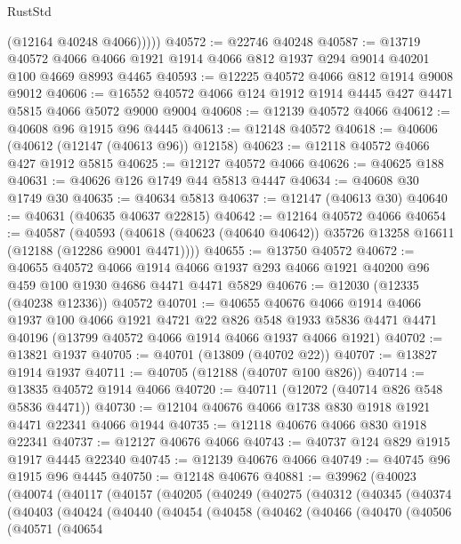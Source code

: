 \begin{lexlean}{RustStd}
\begin{coremodule}
            (@12164 @40248 @4066)))))
@40572 := @22746 @40248
@40587 := @13719
    @40572
    @4066
    @4066
    @1921
    @1914
    @4066
    @812
    @1937
    @294
    @9014
    @40201
    @100
    @4669
    @8993
    @4465
@40593 := @12225 @40572 @4066 @812 @1914 @9008 @9012
@40606 := @16552 @40572 @4066 @124 @1912 @1914 @4445 @427 @4471 @5815 @4066 @5072 @9000 @9004
@40608 := @12139 @40572 @4066
@40612 := @40608 @96 @1915 @96 @4445
@40613 := @12148 @40572
@40618 := @40606 (@40612 (@12147 (@40613 @96)) @12158)
@40623 := @12118 @40572 @4066 @427 @1912 @5815
@40625 := @12127 @40572 @4066
@40626 := @40625 @188
@40631 := @40626 @126 @1749 @44 @5813 @4447
@40634 := @40608 @30 @1749 @30
@40635 := @40634 @5813
@40637 := @12147 (@40613 @30)
@40640 := @40631 (@40635 @40637 @22815)
@40642 := @12164 @40572 @4066
@40654 := @40587
    (@40593 (@40618 (@40623 (@40640 @40642)) @35726 @13258 @16611 (@12188 (@12286 @9001 @4471))))
@40655 := @13750 @40572
@40672 := @40655
    @40572
    @4066
    @1914
    @4066
    @1937
    @293
    @4066
    @1921
    @40200
    @96
    @459
    @100
    @1930
    @4686
    @4471
    @4471
    @5829
@40676 := @12030 (@12335 (@40238 @12336)) @40572
@40701 := @40655
    @40676
    @4066
    @1914
    @4066
    @1937
    @100
    @4066
    @1921
    @4721
    @22
    @826
    @548
    @1933
    @5836
    @4471
    @4471
    @40196
    (@13799 @40572 @4066 @1914 @4066 @1937 @4066 @1921)
@40702 := @13821 @1937
@40705 := @40701 (@13809 (@40702 @22))
@40707 := @13827 @1914 @1937
@40711 := @40705 (@12188 (@40707 @100 @826))
@40714 := @13835 @40572 @1914 @4066
@40720 := @40711 (@12072 (@40714 @826 @548 @5836 @4471))
@40730 := @12104 @40676 @4066 @1738 @830 @1918 @1921 @4471 @22341 @4066 @1944
@40735 := @12118 @40676 @4066 @830 @1918 @22341
@40737 := @12127 @40676 @4066
@40743 := @40737 @124 @829 @1915 @1917 @4445 @22340
@40745 := @12139 @40676 @4066
@40749 := @40745 @96 @1915 @96 @4445
@40750 := @12148 @40676
@40881 := @39962
    (@40023
      (@40074
        (@40117
          (@40157
            (@40205
              (@40249
                (@40275
                  (@40312
                    (@40345
                      (@40374
                        (@40403
                          (@40424
                            (@40440
                              (@40454
                                (@40458
                                  (@40462
                                    (@40466
                                      (@40470
                                        (@40506
                                          (@40571
                                            (@40654

\end{coremodule}
\end{lexlean}
